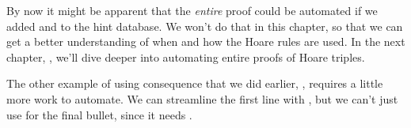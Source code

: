 \documentclass[12pt]{report}
\begin{document}
 By now it might be apparent that the \textit{entire} proof could be
    automated if we added  and  to
    the hint database.  We won't do that in this chapter, so that we
    can get a better understanding of when and how the Hoare rules are
    used.  In the next chapter, , we'll dive deeper into
    automating entire proofs of Hoare triples. 

 The other example of using consequence that we did earlier,
    , requires a little more work to automate.
    We can streamline the first line with , but we can't just use
     for the final bullet, since it needs . 
\end{document}

